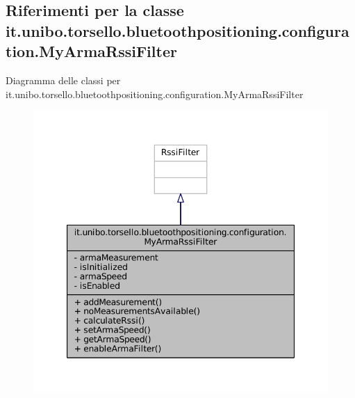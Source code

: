 \hypertarget{classit_1_1unibo_1_1torsello_1_1bluetoothpositioning_1_1configuration_1_1MyArmaRssiFilter}{}\subsection{Riferimenti per la classe it.\+unibo.\+torsello.\+bluetoothpositioning.\+configuration.\+My\+Arma\+Rssi\+Filter}
\label{classit_1_1unibo_1_1torsello_1_1bluetoothpositioning_1_1configuration_1_1MyArmaRssiFilter}


Diagramma delle classi per it.\+unibo.\+torsello.\+bluetoothpositioning.\+configuration.\+My\+Arma\+Rssi\+Filter
\nopagebreak
\begin{figure}[H]
\begin{center}
\leavevmode
\includegraphics[width=347pt]{classit_1_1unibo_1_1torsello_1_1bluetoothpositioning_1_1configuration_1_1MyArmaRssiFilter__inherit__graph}
\end{center}
\end{figure}


